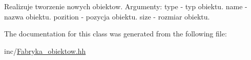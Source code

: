 Realizuje tworzenie nowych obiektow. Argumenty\+: type -\/ typ obiektu. name -\/ nazwa obiektu. pozition -\/ pozycja obiektu. size -\/ rozmiar obiektu. 

The documentation for this class was generated from the following file\+:\begin{DoxyCompactItemize}
\item 
inc/\mbox{\hyperlink{_fabryka__obiektow_8hh}{Fabryka\+\_\+obiektow.\+hh}}\end{DoxyCompactItemize}
